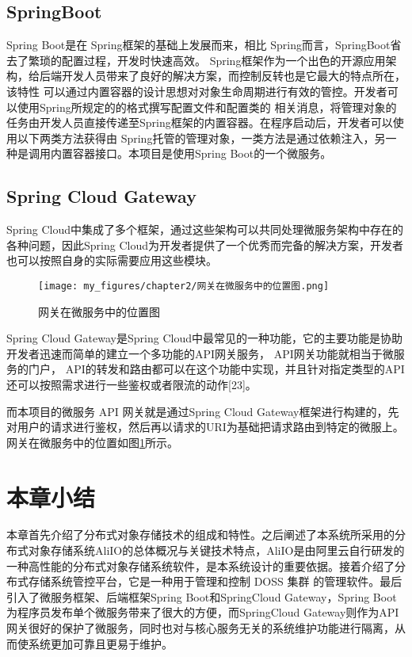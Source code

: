 \subsection{SpringBoot}


Spring Boot是在 Spring框架的基础上发展而来，相比 Spring而言，SpringBoot省去了繁琐的配置过程，开发时快速高效。
Spring框架作为一个出色的开源应用架构，给后端开发人员带来了良好的解决方案，而控制反转也是它最大的特点所在，该特性
可以通过内置容器的设计思想对对象生命周期进行有效的管控。开发者可以使用Spring所规定的的格式撰写配置文件和配置类的
相关消息，将管理对象的任务由开发人员直接传递至Spring框架的内置容器。在程序启动后，开发者可以使用以下两类方法获得由
Spring托管的管理对象，一类方法是通过依赖注入，另一种是调用内置容器接口。本项目是使用Spring Boot的一个微服务。


\subsection{Spring Cloud Gateway}

Spring Cloud中集成了多个框架，通过这些架构可以共同处理微服务架构中存在的各种问题，因此Spring Cloud为开发者提供了一个优秀而完备的解决方案，开发者也可以按照自身的实际需要应用这些模块。

\begin{figure}[h]
    \centering
    \texttt{[image: my\_figures/chapter2/网关在微服务中的位置图.png]}
    \caption{网关在微服务中的位置图}
    \label{fig:/网关在微服务中的位置图}
\end{figure}

Spring Cloud Gateway是Spring Cloud中最常见的一种功能，它的主要功能是协助开发者迅速而简单的建立一个多功能的API网关服务， API网关功能就相当于微服务的门户， API的转发和路由都可以在这个功能中实现，并且针对指定类型的API还可以按照需求进行一些鉴权或者限流的动作[23]。

而本项目的微服务 API 网关就是通过Spring Cloud Gateway框架进行构建的，先对用户的请求进行鉴权，然后再以请求的URI为基础把请求路由到特定的微服上。网关在微服务中的位置如图\ref{fig:/网关在微服务中的位置图}所示。



\section{本章小结}

本章首先介绍了分布式对象存储技术的组成和特性。之后阐述了本系统所采用的分布式对象存储系统AliIO的总体概况与关键技术特点，AliIO是由阿里云自行研发的一种高性能的分布式对象存储系统软件，是本系统设计的重要依据。接着介绍了分布式存储系统管控平台，它是一种用于管理和控制 DOSS 集群
的管理软件。最后引入了微服务框架、后端框架Spring Boot和SpringCloud Gateway，Spring Boot为程序员发布单个微服务带来了很大的方便，而SpringCloud Gateway则作为API网关很好的保护了微服务，同时也对与核心服务无关的系统维护功能进行隔离，从而使系统更加可靠且更易于维护。

